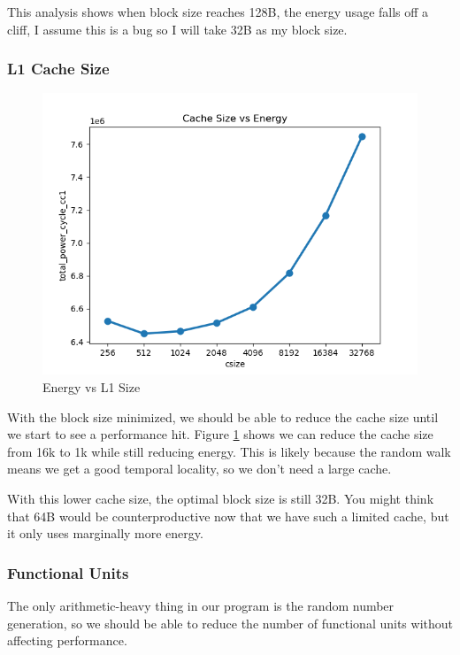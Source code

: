 \documentclass{article}
\begin{document}
\begin{multicols}{2}
  This analysis shows when block size reaches 128B, the energy usage falls off a cliff, I assume this is a bug so I will take 32B as my block size.

  \subsubsection{L1 Cache Size}

  \begin{figure}[H]
    \centering
    \includegraphics[width=\linewidth]{./assets/l1csize_vs_energy.png}
    \caption{Energy vs L1 Size}
    \label{fig:l1size_vs_energy2}
  \end{figure}

  With the block size minimized, we should be able to reduce the cache size until we start to see a performance hit. Figure \ref{fig:l1size_vs_energy2} shows we can reduce the cache size from 16k to 1k while still reducing energy. This is likely because the random walk means we get a good temporal locality, so we don't need a large cache.

  With this lower cache size, the optimal block size is still 32B. You might think that 64B would be counterproductive now that we have such a limited cache, but it only uses marginally more energy.

  \subsubsection{Functional Units}
  The only arithmetic-heavy thing in our program is the random number generation, so we should be able to reduce the number of functional units without affecting performance.


\end{multicols}
\end{document}
